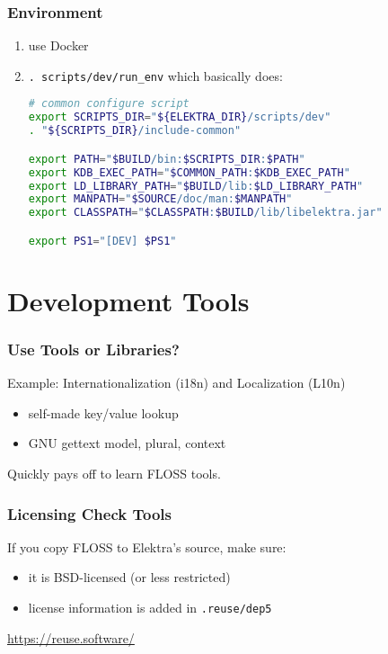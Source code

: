 \begin{frame}[fragile]
	\frametitle{Environment}

	\begin{enumerate}
	\item use Docker
	\item \lstinline{. scripts/dev/run_env} which basically does:

	\begin{lstlisting}[language=sh]
# common configure script
export SCRIPTS_DIR="${ELEKTRA_DIR}/scripts/dev"
. "${SCRIPTS_DIR}/include-common"

export PATH="$BUILD/bin:$SCRIPTS_DIR:$PATH"
export KDB_EXEC_PATH="$COMMON_PATH:$KDB_EXEC_PATH"
export LD_LIBRARY_PATH="$BUILD/lib:$LD_LIBRARY_PATH"
export MANPATH="$SOURCE/doc/man:$MANPATH"
export CLASSPATH="$CLASSPATH:$BUILD/lib/libelektra.jar"

export PS1="[DEV] $PS1"\end{lstlisting}
	\end{enumerate}
\end{frame}

\section{Development Tools}

\begin{frame}[label=i18n and L10n]
	\frametitle{Use Tools or Libraries?}

	Example: Internationalization (i18n) and Localization (L10n)

	\begin{itemize}[<+-| alert@+>]
	\item self-made key/value lookup
	\item GNU gettext model, plural, context
	\end{itemize}

	\pause[\thebeamerpauses]

	\begin{finding}
	Quickly pays off to learn FLOSS tools.
	\end{finding}
\end{frame}

\begin{frame}[label=licencing]
	\frametitle{Licensing Check Tools}

	If you copy FLOSS to Elektra's source, make sure:

	\begin{itemize}[<+-| alert@+>]
	\item it is BSD-licensed (or less restricted)
	\item license information is added in \texttt{.reuse/dep5}
	\end{itemize}

	\pause[\thebeamerpauses]

	\url{https://reuse.software/}
\end{frame}

